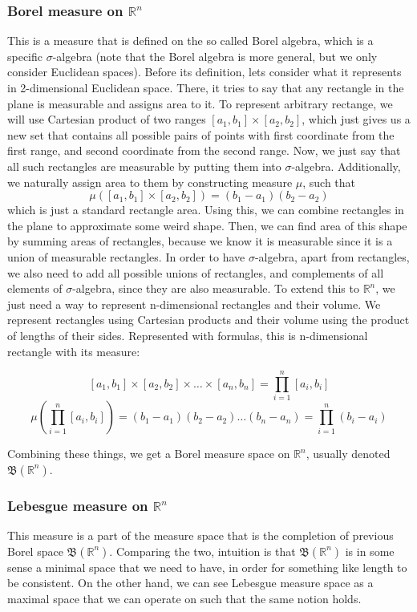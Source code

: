 \documentclass{article}
\begin{document}
\subsubsection{Borel measure on $\mathbb{R}^n$}
This is a measure that is defined on the so called Borel algebra, which is a specific $\sigma$-algebra (note that the Borel algebra is more general, but we only consider Euclidean spaces). Before its definition, lets consider what it represents in 2-dimensional Euclidean space. There, it tries to say that any rectangle in the plane is measurable and assigns area to it. To represent arbitrary rectange, we will use Cartesian product of two ranges $[a_1, b_1]\times[a_2, b_2]$, which just gives us a new set that contains all possible pairs of points with first coordinate from the first range, and second coordinate from the second range. Now, we just say that all such rectangles are measurable by putting them into $\sigma$-algebra. Additionally, we naturally assign area to them by constructing measure $\mu$, such that
\[\mu([a_1, b_1]\times[a_2, b_2])=(b_1-a_1)(b_2-a_2)\]
which is just a standard rectangle area. Using this, we can combine rectangles in the plane to approximate some weird shape. Then, we can find area of this shape by summing areas of rectangles, because we know it is measurable since it is a union of measurable rectangles. In order to have $\sigma$-algebra, apart from rectangles, we also need to add all possible unions of rectangles, and complements of all elements of $\sigma$-algebra, since they are also measurable.
\newline\indent To extend this to $\mathbb{R}^n$, we just need a way to represent n-dimensional rectangles and their volume. We represent rectangles using Cartesian products and their volume using the product of lengths of their sides. Represented with formulas, this is n-dimensional rectangle with its measure:

\[ [a_1,b_1]\times[a_2,b_2]\times\dots\times[a_n,b_n] = \prod_{i=1}^{n}[a_i,b_i] \]
\[ \mu(\prod_{i=1}^{n}[a_i,b_i])=(b_1-a_1)(b_2-a_2)\dots(b_n-a_n)=\prod_{i=1}^{n}(b_i-a_i) \]

Combining these things, we get a Borel measure space on $\mathbb{R}^n$, usually denoted $\mathfrak{B}(\mathbb{R}^n)$.

\subsubsection{Lebesgue measure on $\mathbb{R}^n$}
This measure is a part of the measure space that is the completion of previous Borel space $\mathfrak{B}(\mathbb{R}^n)$. Comparing the two, intuition is that $\mathfrak{B}(\mathbb{R}^n)$ is in some sense a minimal space that we need to have, in order for something like length to be consistent. On the other hand, we can see Lebesgue measure space as a maximal space that we can operate on such that the same notion holds.
\end{document}
